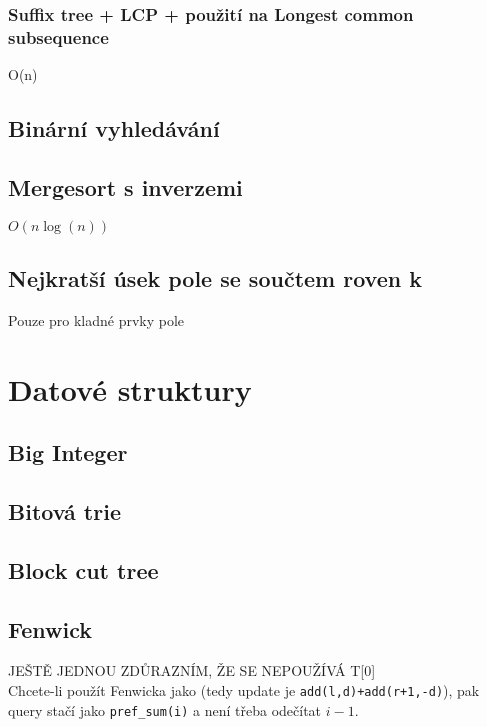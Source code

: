 \documentclass[10pt, a4paper]{article}
\begin{document}
\subsubsection{Suffix tree + LCP + použití na Longest common subsequence}
O(n)


\subsection{Binární vyhledávání}


\subsection{Mergesort s inverzemi}
$O(n\log(n))$


\subsection{Nejkratší úsek pole se součtem roven k}
Pouze pro kladné prvky pole


\newpage

\section{Datové struktury}

\subsection{Big Integer}


\subsection{Bitová trie}


\subsection{Block cut tree}


\subsection{Fenwick}
JEŠTĚ JEDNOU ZDŮRAZNÍM, ŽE SE NEPOUŽÍVÁ T[0]\\
Chcete-li použít Fenwicka jako  (tedy update je \texttt{add(l,d)+add(r+1,-d)}), pak query stačí jako \texttt{pref\_sum(i)} a není třeba odečítat $i-1$.

\end{document}
